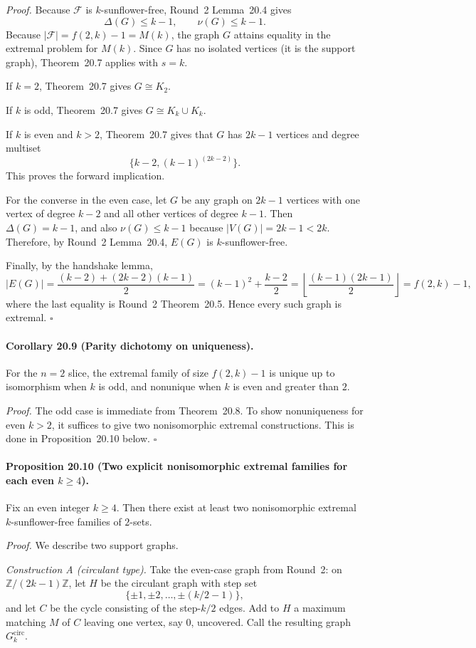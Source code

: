 \emph{Proof.}
Because $\mathcal F$ is $k$-sunflower-free, Round~2 Lemma~20.4 gives
\[
\Delta(G)\le k-1,
\qquad
\nu(G)\le k-1.
\]
Because $|\mathcal F|=f(2,k)-1=M(k)$, the graph $G$ attains equality in the extremal problem for $M(k)$. Since $G$ has no isolated vertices (it is the support graph), Theorem~20.7 applies with $s=k$.

If $k=2$, Theorem~20.7 gives $G\cong K_2$.

If $k$ is odd, Theorem~20.7 gives $G\cong K_k\cup K_k$.

If $k$ is even and $k>2$, Theorem~20.7 gives that $G$ has $2k-1$ vertices and degree multiset
\[
\{k-2,(k-1)^{(2k-2)}\}.
\]
This proves the forward implication.

For the converse in the even case, let $G$ be any graph on $2k-1$ vertices with one vertex of degree $k-2$ and all other vertices of degree $k-1$. Then $\Delta(G)=k-1$, and also $\nu(G)\le k-1$ because $|V(G)|=2k-1<2k$. Therefore, by Round~2 Lemma~20.4, $E(G)$ is $k$-sunflower-free.

Finally, by the handshake lemma,
\[
|E(G)|=\frac{(k-2)+(2k-2)(k-1)}{2}
=(k-1)^2+\frac{k-2}{2}
=\left\lfloor \frac{(k-1)(2k-1)}{2}\right\rfloor
=f(2,k)-1,
\]
where the last equality is Round~2 Theorem~20.5. Hence every such graph is extremal.
\hfill$\square$

\paragraph{Corollary 20.9 (Parity dichotomy on uniqueness).}
For the $n=2$ slice, the extremal family of size $f(2,k)-1$ is unique up to isomorphism when $k$ is odd, and nonunique when $k$ is even and greater than $2$.

\emph{Proof.}
The odd case is immediate from Theorem~20.8. To show nonuniqueness for even $k>2$, it suffices to give two nonisomorphic extremal constructions. This is done in Proposition~20.10 below.
\hfill$\square$

\paragraph{Proposition 20.10 (Two explicit nonisomorphic extremal families for each even $k\ge 4$).}
Fix an even integer $k\ge 4$. Then there exist at least two nonisomorphic extremal $k$-sunflower-free families of $2$-sets.

\emph{Proof.}
We describe two support graphs.

\smallskip
\noindent
\emph{Construction A (circulant type).}
Take the even-case graph from Round~2: on $\mathbb Z/(2k-1)\mathbb Z$, let $H$ be the circulant graph with step set
\[
\{\pm 1,\pm 2,\dots,\pm (k/2-1)\},
\]
and let $C$ be the cycle consisting of the step-$k/2$ edges. Add to $H$ a maximum matching $M$ of $C$ leaving one vertex, say $0$, uncovered. Call the resulting graph $G^{\mathrm{circ}}_k$.

